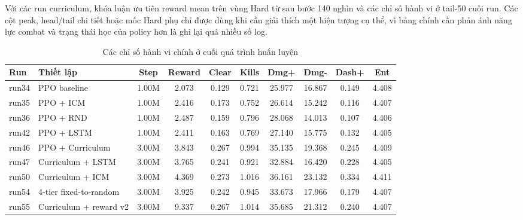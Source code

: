Với các run curriculum, khóa luận ưu tiên reward mean trên vùng Hard từ sau bước 140 nghìn và các chỉ số hành vi ở tail-50 cuối run. Các cột peak, head/tail chi tiết hoặc mốc Hard phụ chỉ được dùng khi cần giải thích một hiện tượng cụ thể, vì bảng chính cần phản ánh năng lực combat và trạng thái học của policy hơn là ghi lại quá nhiều số log.

\begin{table}[H]
    \centering
    \scriptsize
    \setlength{\tabcolsep}{4pt}
    \renewcommand{\arraystretch}{1.15}
    \caption{Các chỉ số hành vi chính ở cuối quá trình huấn luyện}
    \label{tab:run_metrics_main}
    \begin{tabular}{l p{3.0cm} c c c c c c c c}
        \toprule
        \textbf{Run} & \textbf{Thiết lập} & \textbf{Step} & \textbf{Reward} & \textbf{Clear} & \textbf{Kills} & \textbf{Dmg+} & \textbf{Dmg-} & \textbf{Dash+} & \textbf{Ent} \\
        \midrule
        run34 & PPO baseline & 1.00M & 2.073 & 0.129 & 0.721 & 25.977 & 16.867 & 0.149 & 4.408 \\
        run35 & PPO + ICM & 1.00M & 2.416 & 0.173 & 0.752 & 26.614 & 15.242 & 0.116 & 4.407 \\
        run36 & PPO + RND & 1.00M & 2.487 & 0.159 & 0.796 & 28.068 & 14.013 & 0.107 & 4.406 \\
        run42 & PPO + LSTM & 1.00M & 2.411 & 0.163 & 0.769 & 27.140 & 15.775 & 0.132 & 4.405 \\
        run46 & PPO + Curriculum & 3.00M & 3.843 & 0.267 & 0.994 & 35.135 & 19.368 & 0.245 & 4.409 \\
        run47 & Curriculum + LSTM & 3.00M & 3.765 & 0.241 & 0.921 & 32.884 & 16.420 & 0.228 & 4.405 \\
        run50 & Curriculum + ICM & 3.00M & 4.369 & 0.273 & 1.016 & 36.161 & 23.132 & 0.334 & 4.411 \\
        run54 & 4-tier fixed-to-random & 3.00M & 3.925 & 0.242 & 0.945 & 33.673 & 17.966 & 0.179 & 4.407 \\
        run55 & Curriculum + reward v2 & 3.00M & 9.337 & 0.267 & 1.014 & 35.685 & 21.312 & 0.240 & 4.407 \\
        \bottomrule
    \end{tabular}
\end{table}

